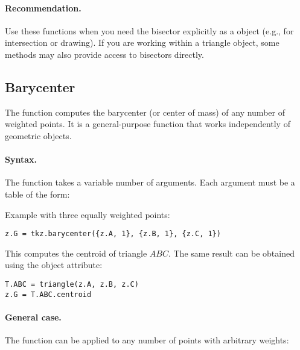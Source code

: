 \paragraph{Recommendation.}
Use these functions when you need the bisector explicitly as a  object (e.g., for intersection or drawing). If you are working within a triangle object, some methods may also provide access to bisectors directly.


\subsection{Barycenter} %
\label{sub:misc_barycenter}

The function  computes the barycenter (or center of mass) of any number of weighted points. It is a general-purpose function that works independently of geometric objects.

\paragraph{Syntax.}
The function takes a variable number of arguments. Each argument must be a table of the form:

\begin{center}
\end{center}

\noindent
Example with three equally weighted points:
\begin{mybox}
\begin{verbatim}
z.G = tkz.barycenter({z.A, 1}, {z.B, 1}, {z.C, 1})
\end{verbatim}
\end{mybox}

This computes the centroid of triangle $ABC$. The same result can be obtained using the object attribute:

\begin{mybox}
\begin{verbatim}
T.ABC = triangle(z.A, z.B, z.C)
z.G = T.ABC.centroid
\end{verbatim}
\end{mybox}

\paragraph{General case.}
The function can be applied to any number of points with arbitrary weights:

